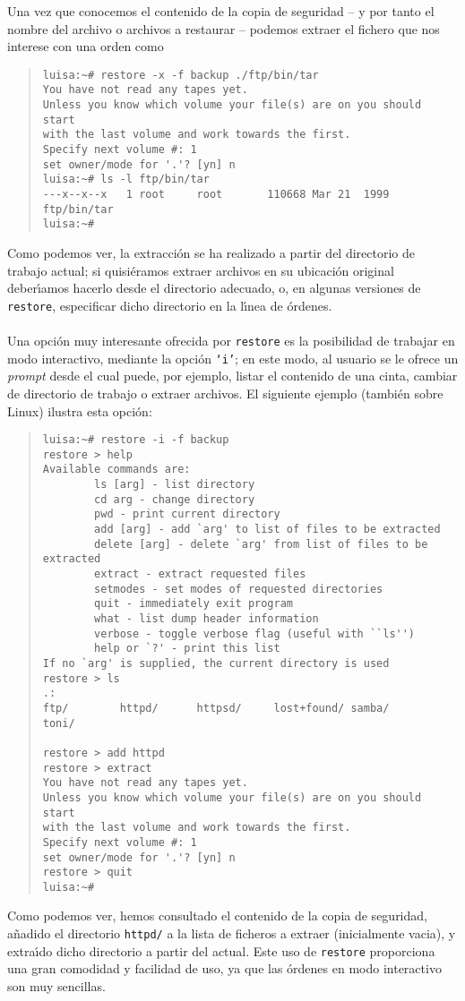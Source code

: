 Una vez que conocemos el contenido de la copia de seguridad -- y por tanto el
nombre del archivo o archivos a restaurar -- podemos extraer el fichero que nos
interese con una orden como
\begin{quote}
\begin{verbatim}
luisa:~# restore -x -f backup ./ftp/bin/tar     
You have not read any tapes yet.
Unless you know which volume your file(s) are on you should start
with the last volume and work towards the first.
Specify next volume #: 1
set owner/mode for '.'? [yn] n
luisa:~# ls -l ftp/bin/tar 
---x--x--x   1 root     root       110668 Mar 21  1999 ftp/bin/tar
luisa:~#
\end{verbatim}
\end{quote}
Como podemos ver, la extracci\'on se ha realizado a partir del directorio 
de trabajo actual; si quisi\'eramos extraer archivos en su ubicaci\'on original
deber\'{\i}amos hacerlo desde el directorio adecuado, o, en algunas versiones
de {\tt restore}, especificar dicho directorio en la l\'{\i}nea de \'ordenes.\\
\\Una opci\'on muy interesante ofrecida por {\tt restore} es la posibilidad de
trabajar en modo interactivo, mediante la opci\'on {\tt `i'}; en este modo, al
usuario se le ofrece un {\it prompt} desde el cual puede, por ejemplo, listar
el contenido de una cinta, cambiar de directorio de trabajo o extraer archivos.
El siguiente ejemplo (tambi\'en sobre Linux) ilustra esta opci\'on:
\begin{quote}
\begin{verbatim}
luisa:~# restore -i -f backup
restore > help
Available commands are:
        ls [arg] - list directory
        cd arg - change directory
        pwd - print current directory
        add [arg] - add `arg' to list of files to be extracted
        delete [arg] - delete `arg' from list of files to be extracted
        extract - extract requested files
        setmodes - set modes of requested directories
        quit - immediately exit program
        what - list dump header information
        verbose - toggle verbose flag (useful with ``ls'')
        help or `?' - print this list
If no `arg' is supplied, the current directory is used
restore > ls
.:
ftp/        httpd/      httpsd/     lost+found/ samba/      toni/

restore > add httpd
restore > extract
You have not read any tapes yet.
Unless you know which volume your file(s) are on you should start
with the last volume and work towards the first.
Specify next volume #: 1
set owner/mode for '.'? [yn] n
restore > quit
luisa:~# 
\end{verbatim}
\end{quote}
Como podemos ver, hemos consultado el contenido de la copia de seguridad, 
a\~nadido el directorio {\tt httpd/} a la lista de ficheros a extraer 
(inicialmente vacia), y extra\'{\i}do dicho directorio a partir del actual. 
Este uso de {\tt restore} proporciona una gran comodidad y facilidad de uso, ya 
que las \'ordenes en modo interactivo son muy sencillas.
